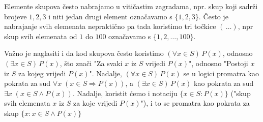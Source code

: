 Elemente skupova često nabrajamo u vitičastim zagradama, npr. skup koji sadrži brojeve \(1, 2, 3\) i niti jedan drugi element označavamo s \(\{1, 2, 3\}\). Često je nabrajanje svih elemenata nepraktično pa tada koristimo tri točkice \((\,\dots)\), npr skup svih elemenata od \(1\) do \(100\) označavamo s \(\{1, 2,\dots, 100\}\).

Važno je naglasiti i da kod skupova često koristimo \((\forall x\in S)\, P(x)\), odnosno \((\exists x\in S)\, P(x)\), što znači "Za svaki \(x\) iz \(S\) vrijedi \(P(x)\)", odnosno "Postoji \(x\) iz \(S\) za kojeg vrijedi \(P(x)\)". Nadalje, \((\forall x\in S)\, P(x)\) se u logici promatra kao pokrata za sud \(\forall x\; \left(x\in S\Rightarrow P(x)\right)\), a \((\exists x\in S)\, P(x)\) kao pokrata za sud \(\exists x\; \left(x\in S\wedge P(x)\right)\). Nadalje, koristit ćemo i notaciju \(\{x\in S : P(x)\}\) ("skup svih elemenata \(x\) iz \(S\) za koje vrijedi \(P(x)\)"), i to se promatra kao pokrata za skup \(\{x : x\in S\wedge P(x)\}\)

